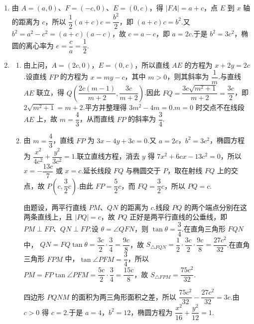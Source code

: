 \begin{solution}
\begin{enumerate}
\item 由 \(A=(a,0)\)、\(F=(-c,0)\)、\(E=(0,c)\)，得 \(|FA|=a+c\)，点 \(E\) 到 \(x\) 轴的距离为 \(c\)，所以
\(\dfrac12(a+c)c=\dfrac{b^2}{2}\)，即 \((a+c)c=b^2\).又 \(b^2=a^2-c^2=(a+c)(a-c)\)，故 \(c=a-c\)，即 \(a=2c\).于是 \(b^2=3c^2\)，椭圆的离心率为 \(e=\dfrac ca=\dfrac12\).

\item
\begin{enumerate}
\item 由上问，\(A=(2c,0)\)，\(E=(0,c)\)，所以直线 \(AE\) 的方程为 \(x+2y=2c\).设直线 \(FP\) 的方程为 \(x=my-c\)，其中 \(m>0\)，则其斜率为 \(\dfrac1m\).与直线 \(AE\) 联立，得
\(Q\left(\dfrac{2c(m-1)}{m+2},\dfrac{3c}{m+2}\right)\).因此
\(FQ=\dfrac{3c\sqrt{m^2+1}}{m+2}=\dfrac{3c}{2}\)，即 \(2\sqrt{m^2+1}=m+2\).平方并整理得 \(3m^2-4m=0\).\(m=0\) 时交点不在线段 \(AE\) 上，故 \(m=\dfrac43\)，从而直线 \(FP\) 的斜率为 \(\dfrac34\).

\item 由 \(m=\dfrac43\)，直线 \(FP\) 为 \(3x-4y+3c=0\).又 \(a=2c\)，\(b^2=3c^2\)，椭圆方程为 \(\dfrac{x^2}{4c^2}+\dfrac{y^2}{3c^2}=1\).联立直线方程，消去 \(y\) 得
\(7x^2+6cx-13c^2=0\)，所以 \(x=-\dfrac{13c}{7}\) 或 \(x=c\).延长线段 \(FQ\) 与椭圆交于 \(P\)，取在射线 \(FQ\) 上的交点，故 \(P\left(c,\dfrac32c\right)\).由此 \(FP=\dfrac52c\)，而 \(FQ=\dfrac32c\)，所以 \(PQ=c\).

由题设，两平行直线 \(PM\)、\(QN\) 的距离为 \(c\).线段 \(PQ\) 的两个端点分别在这两条直线上，且 \(|PQ|=c\)，故 \(PQ\) 正好是两平行直线的公垂线，即 \(PM\perp FP\)、\(QN\perp FP\).设 \(\theta=\angle QFN\)，则 \(\tan\theta=\dfrac34\).在直角三角形 \(FQN\) 中，
\(QN=FQ\tan\theta=\dfrac{3c}{2}\cdot\dfrac34=\dfrac{9c}{8}\)，故 \(S_{\triangle FQN}=\dfrac12\cdot\dfrac{3c}{2}\cdot\dfrac{9c}{8}=\dfrac{27c^2}{32}\).在直角三角形 \(FPM\) 中，\(\tan\angle PFM=\dfrac34\)，所以 \(PM=FP\tan\angle PFM=\dfrac{5c}{2}\cdot\dfrac34=\dfrac{15c}{8}\)，故 \(S_{\triangle FPM}=\dfrac{75c^2}{32}\).

四边形 \(PQNM\) 的面积为两三角形面积之差，所以 \(\dfrac{75c^2}{32}-\dfrac{27c^2}{32}=3c\).由 \(c>0\) 得 \(c=2\).于是 \(a=4\)，\(b^2=12\)，椭圆方程为 \(\dfrac{x^2}{16}+\dfrac{y^2}{12}=1\).
\end{enumerate}
\end{enumerate}
\end{solution}
